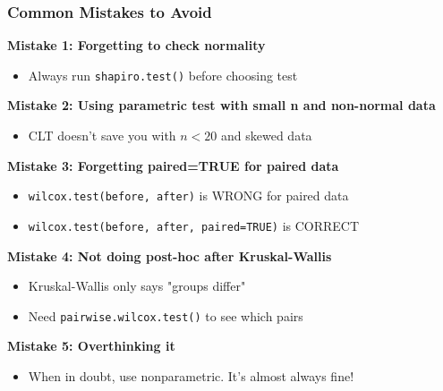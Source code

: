 \documentclass{beamer}
\begin{document}
\begin{frame}
\frametitle{Common Mistakes to Avoid}

\textbf{Mistake 1: Forgetting to check normality}
\begin{itemize}
\item Always run \texttt{shapiro.test()} before choosing test
\end{itemize}

\vspace{0.3cm}
\textbf{Mistake 2: Using parametric test with small n and non-normal data}
\begin{itemize}
\item CLT doesn't save you with $n < 20$ and skewed data
\end{itemize}

\vspace{0.3cm}
\textbf{Mistake 3: Forgetting paired=TRUE for paired data}
\begin{itemize}
\item \texttt{wilcox.test(before, after)} is WRONG for paired data
\item \texttt{wilcox.test(before, after, paired=TRUE)} is CORRECT
\end{itemize}

\vspace{0.3cm}
\textbf{Mistake 4: Not doing post-hoc after Kruskal-Wallis}
\begin{itemize}
\item Kruskal-Wallis only says "groups differ"
\item Need \texttt{pairwise.wilcox.test()} to see which pairs
\end{itemize}

\vspace{0.3cm}
\textbf{Mistake 5: Overthinking it}
\begin{itemize}
\item When in doubt, use nonparametric. It's almost always fine!
\end{itemize}
\end{frame}
\end{document}
